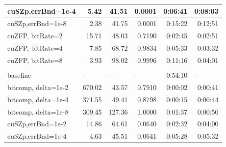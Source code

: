 \documentclass[Ingles]{ic-tese-v3}
\begin{document}
\begin{table}[h!]
\begin{tabular}{|lrrrrr|}
\multicolumn{1}{|l|}{cuSZp,errBnd=1e-4} &
  \multicolumn{1}{r|}{5.42} &
  \multicolumn{1}{r|}{41.51} &
  \multicolumn{1}{r|}{0.0001} &
  \multicolumn{1}{r|}{0:06:41} &
  0:08:03 \\ \hline
\multicolumn{1}{|l|}{cuSZp,errBnd=1e-8} &
  \multicolumn{1}{r|}{2.38} &
  \multicolumn{1}{r|}{41.75} &
  \multicolumn{1}{r|}{0.0001} &
  \multicolumn{1}{r|}{0:15:22} &
  0:12:51 \\ \hline
\multicolumn{1}{|l|}{cuZFP, bitRate=2} &
  \multicolumn{1}{r|}{15.71} &
  \multicolumn{1}{r|}{48.03} &
  \multicolumn{1}{r|}{0.7190} &
  \multicolumn{1}{r|}{0:02:45} &
  0:02:51 \\ \hline
\multicolumn{1}{|l|}{cuZFP, bitRate=4} &
  \multicolumn{1}{r|}{7.85} &
  \multicolumn{1}{r|}{68.72} &
  \multicolumn{1}{r|}{0.9834} &
  \multicolumn{1}{r|}{0:05:33} &
  0:03:32 \\ \hline
\multicolumn{1}{|l|}{cuZFP, bitRate=8} &
  \multicolumn{1}{r|}{3.93} &
  \multicolumn{1}{r|}{98.02} &
  \multicolumn{1}{r|}{0.9996} &
  \multicolumn{1}{r|}{0:11:16} &
  0:04:01 \\ \hline
\rowcolor[HTML]{C0C0C0} 
\multicolumn{6}{|l|}{\cellcolor[HTML]{C0C0C0}\textbf{Salt}} \\ \hline
\multicolumn{1}{|l|}{baseline} &
  \multicolumn{1}{l|}{-} &
  \multicolumn{1}{l|}{-} &
  \multicolumn{1}{l|}{-} &
  \multicolumn{1}{r|}{0:54:10} &
  \multicolumn{1}{l|}{-} \\ \hline
\multicolumn{1}{|l|}{bitcomp, delta=1e-2} &
  \multicolumn{1}{r|}{670.02} &
  \multicolumn{1}{r|}{43.57} &
  \multicolumn{1}{r|}{0.7910} &
  \multicolumn{1}{r|}{0:00:02} &
  0:00:41 \\ \hline
\multicolumn{1}{|l|}{bitcomp, delta=1e-4} &
  \multicolumn{1}{r|}{371.55} &
  \multicolumn{1}{r|}{49.41} &
  \multicolumn{1}{r|}{0.8798} &
  \multicolumn{1}{r|}{0:00:15} &
  0:00:44 \\ \hline
\multicolumn{1}{|l|}{bitcomp, delta=1e-8} &
  \multicolumn{1}{r|}{309.45} &
  \multicolumn{1}{r|}{127.36} &
  \multicolumn{1}{r|}{1.0000} &
  \multicolumn{1}{r|}{0:01:37} &
  0:00:50 \\ \hline
\multicolumn{1}{|l|}{cuSZp,errBnd=1e-2} &
  \multicolumn{1}{r|}{14.86} &
  \multicolumn{1}{r|}{64.61} &
  \multicolumn{1}{r|}{0.0640} &
  \multicolumn{1}{r|}{0:02:32} &
  0:04:00 \\ \hline
\multicolumn{1}{|l|}{cuSZp,errBnd=1e-4} &
  \multicolumn{1}{r|}{4.63} &
  \multicolumn{1}{r|}{45.51} &
  \multicolumn{1}{r|}{0.0641} &
  \multicolumn{1}{r|}{0:05:28} &
  0:05:32 \\ \hline

\end{tabular}
\end{table}
\end{document}

